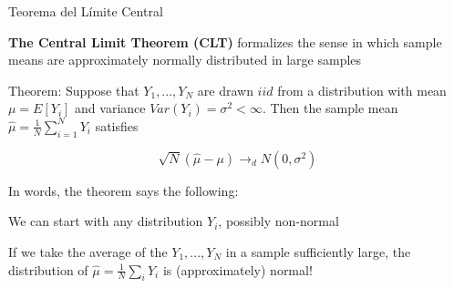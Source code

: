 \documentclass[11pt,handout,aspectratio=169]{beamer}
\newenvironment{wideitemize}{\itemize\addtolength{\itemsep}{10pt}}{\enditemize}
\begin{document}
\begin{frame}{Teorema del Límite Central}
\begin{wideitemize}

\item
\textbf{The Central Limit Theorem (CLT)} formalizes the sense in which sample means are approximately normally distributed in large samples

\pause
\item
Theorem: Suppose that $Y_1,...,Y_N$ are drawn $iid$ from a distribution with mean $\mu = E[Y_i]$ and variance $Var(Y_i) = \sigma^2 < \infty$. Then the sample mean $\hat\mu = \frac{1}{N} \sum_{i=1}^N Y_i$ satisfies

$$ \sqrt{N} (\hat\mu - \mu) \rightarrow_d N(0, \sigma^2) $$


\pause
\item
In words, the theorem says the following: 


\begin{enumerate}
\normalsize{
\item 
We can start with any distribution $Y_i$, possibly non-normal 

\item
If we take the average of the $Y_1,...,Y_N$ in a sample sufficiently large, the distribution of $\hat\mu = \frac{1}{N} \sum_i Y_i$ is (approximately) normal! 
}
\end{enumerate}

\end{wideitemize}	

\end{frame}
\end{document}
